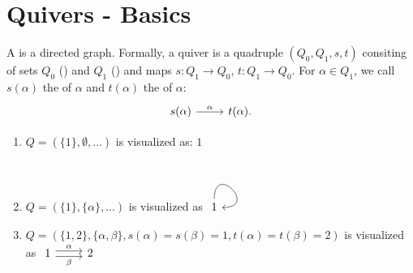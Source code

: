 \section{Quivers - Basics}
\begin{defn}
	A  is a \glqq directed graph\grqq. Formally, a quiver is a quadruple $(Q_0,Q_1,s,t)$ consiting of sets $Q_0$ () and $Q_1$ () and maps $s:Q_1\to Q_0$, $t:Q_1\to Q_0$. For $\alpha \in Q_1$, we call $s(\alpha)$ the  of $\alpha$ and $t(\alpha)$ the  of $\alpha$:
	\[
	\begin{tikzcd}
		s(\alpha)\ar{r}{\alpha}&t(\alpha).
	\end{tikzcd}
	\]
\end{defn}
\begin{bsp}
	\begin{enumerate}
		\item $Q=(\{1\},\emptyset,...)$ is visualized as: $1$
		\item $Q=(\{1\},\{\alpha\},...)$ is visualized as $\begin{tikzcd}1\arrow[out=90,in=0,loop]\end{tikzcd}$
		\item $Q=(\{1,2\},\{\alpha,\beta\},s(\alpha)=s(\beta)=1,t(\alpha)=t(\beta)=2)$ is visualized as $\begin{tikzcd}1\ar[shift left]{r}{\alpha}\ar[shift right,swap]{r}{\beta}&2\end{tikzcd}$
	\end{enumerate}
	\end{bsp}
